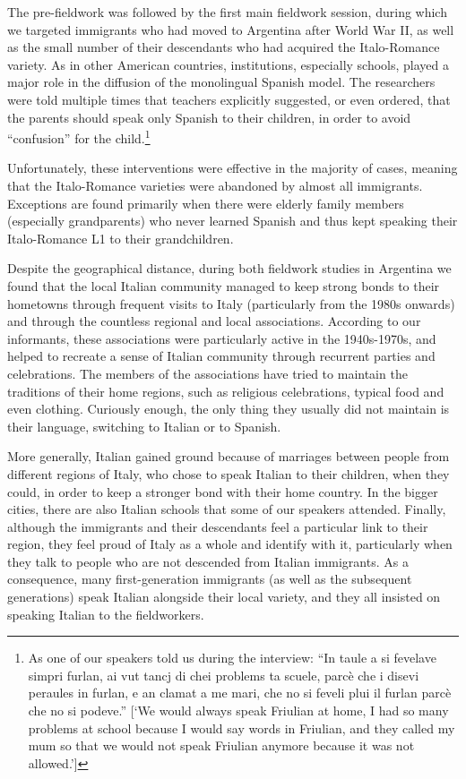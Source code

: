 \documentclass[output=paper,hidelinks]{langscibook}
\begin{document}
The pre-fieldwork was followed by the first main fieldwork session, during which we targeted immigrants who had moved to Argentina after World War II, as well as the small number of their descendants who had acquired the Italo-Romance variety. As in other American countries, institutions, especially schools, played a major role in the diffusion of the monolingual Spanish model. The researchers were told multiple times that teachers explicitly suggested, or even ordered, that the parents should speak only Spanish to their children, in order to avoid “confusion” for the child.\footnote{As one of our speakers told us during the interview: ``In taule a si fevelave simpri furlan, ai vut tancj di chei problems ta scuele, parcè che i disevi peraules in furlan, e an clamat a me mari, che no si feveli plui il furlan parcè che no si podeve.'' [`We would always speak Friulian at home, I had so many problems at school because I would say words in Friulian, and they called my mum so that we would not speak Friulian anymore because it was not allowed.']} 


\hspace*{-3pt}Unfortunately, these interventions were effective in the majority of cases, meaning that the Italo-Romance varieties were abandoned by almost all immigrants. Exceptions are found primarily when there were elderly family members (especially grandparents) who never learned Spanish and thus kept speaking their Italo-Romance L1 to their grandchildren.

Despite the geographical distance, during both fieldwork studies in Argentina we found that the local Italian community managed to keep strong bonds to their hometowns through frequent visits to Italy (particularly from the 1980s onwards) and through the countless regional and local associations. According to our informants, these associations were particularly active in the 1940s-1970s, and helped to recreate a sense of Italian community through recurrent parties and celebrations. The members of the associations have tried to maintain the traditions of their home regions, such as religious celebrations, typical food and even clothing. Curiously enough, the only thing they usually did not maintain is their language, switching to Italian or to Spanish. 

More generally, Italian gained ground because of marriages between people from different regions of Italy, who chose to speak Italian to their children, when they could, in order to keep a stronger bond with their home country. In the bigger cities, there are also Italian schools that some of our speakers attended. Finally, although the immigrants and their descendants feel a particular link to their region, they feel proud of Italy as a whole and identify with it, particularly when they talk to people who are not descended from Italian immigrants. As a consequence, many first-generation immigrants (as well as the subsequent generations) speak Italian alongside their local variety, and they all insisted on speaking Italian to the fieldworkers.
\end{document}
